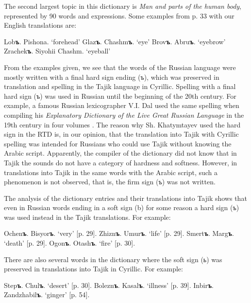 \documentclass[output=paper,colorlinks,citecolor=brown,arabicfont,chinesefont]{langscibook}
\begin{document}
The second largest topic in this dictionary is \emph{Man and parts of the human body}, represented by 90 words and expressions. Some examples from p. 33 with our English translations are:

\ea
    \ea Lob\textbf{ъ}.	Pishona.
    \glt `forehead'
    \ex Glaz\textbf{ъ}.	Chashm\textbf{ъ}.
    \glt `eye'	
    \ex Brov\textbf{ъ}.	Abru\textbf{ъ}.
    \glt `eyebrow'
    \ex Zrachek\textbf{ъ}.	Siyohii Chashm.
    \glt `eyeball'
     \z
\z

From the examples given, we see that the words of the Russian language were mostly written with a final hard sign ending (ъ), which was preserved in translation and spelling in the Tajik language in Cyrillic. Spelling with a final hard sign (ъ) was used in Russian until the beginning of the 20th century. For example, a famous Russian lexicographer V.I. Dal used the same spelling when compiling his \emph{Explanatory Dictionary of the Live Great Russian Language} in the 19th century in four volumes \citep{Dal1966}. The reason why Sh. Khatymtayev used the hard sign in the RTD is, in our opinion, that the translation into Tajik with Cyrillic spelling was intended for Russians who could use Tajik without knowing the Arabic script. Apparently, the compiler of the dictionary did not know that in Tajik the sounds do not have a category of hardness and softness. However, in translations into Tajik in the same words with the Arabic script, such a phenomenon is not observed, that is, the firm sign (ъ) was not written.

The analysis of the dictionary entries and their translations into Tajik shows that even in Russian words ending in a soft sign (b) for some reason a hard sign (ъ) was used instead in the Tajik translations. For example:

\ea
    \ea Ochen\textbf{ъ}.	Bisyor\textbf{ъ}.
        \glt `very' 		[p. 29].
    \ex Zhizn\textbf{ъ}. 	Umur\textbf{ъ}.
        \glt `life'  		[p. 29].
    \ex Smert\textbf{ъ}. 	Marg\textbf{ъ}.
        \glt `death' 		 [p. 29].
    \ex Ogon\textbf{ъ}. 	Otash\textbf{ъ}.
        \glt `fire'  		[p. 30].
    \z
\z

There are also several words in the dictionary where the soft sign (ь) was preserved in translations into Tajik in Cyrillic. For example:

\ea
    \ea Step\textbf{ъ}. 	Chul\textbf{ъ}.
        \glt `desert'  [p. 30].
    \ex Bolezn\textbf{ъ}.      Kasal\textbf{ъ}.
        \glt `illness'   	 	[p. 39].
    \ex Inbir\textbf{ъ}.	Zandzhabil\textbf{ъ}.
        \glt `ginger'  	[p. 54].
    \z
\z
\end{document}
